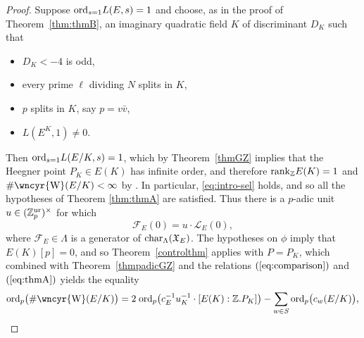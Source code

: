 \documentclass[10pt]{amsart}
\newcommand{\sha}{\text{\wncyr{W}}}
\numberwithin{equation}{section}
\theoremstyle{definition}
\theoremstyle{remark}
\newcommand{\Z}{\mathbb{Z}}
\begin{document}
\begin{proof}
Suppose ${\rm ord}_{s=1}L(E,s)=1$ and choose, as in the proof of Theorem~\ref{thm:thmB}, an imaginary quadratic field $K$ of discriminant $D_K$ such that
\begin{itemize}
\item[(a)] $D_K<-4$ is odd,
\item[(b)] every prime $\ell$ dividing $N$ splits in $K$,
\item[(c)] $p$ splits in $K$, say $p=v\bar{v}$,
\item[(d)] $L(E^K,1)\neq 0$.
\end{itemize}
Then ${\rm ord}_{s=1}L(E/K,s)=1$, which by Theorem~\ref{thmGZ} implies that the Heegner point $P_K\in E(K)$ has infinite order, and therefore ${\rm rank}_\Z E(K)=1$ and $\#\sha(E/K)<\infty$ by \cite{kolyvagin-mw-sha}. 
In particular, \eqref{eq:intro-sel} holds, and so all the hypotheses of Theorem \ref{thm:thmA} are satisfied. Thus there is a $p$-adic unit $u\in(\Z_p^{{\rm ur}})^\times$ for which
\begin{equation}\label{eq:thmA}
\mathcal{F}_E(0)=u\cdot\mathcal{L}_E(0),
\end{equation}
where $\mathcal{F}_E\in\Lambda$ is a generator of ${\rm char}_\Lambda(\mathfrak{X}_E)$. The hypotheses on $\phi$ imply that $E(K)[p]=0$, and so Theorem~\ref{controlthm} applies with $P=P_K$, which combined with Theorem~\ref{thmpadicGZ} and the relations $(\ref{eq:comparison})$ and $(\ref{eq:thmA})$ 
yields the equality
\begin{equation}\label{eq:thmA-bis}
{\rm ord}_p\bigl(\#\sha(E/K)\bigr)=2\;{\rm ord}_p\bigl(c_E^{-1}u_K^{-1}\cdot[E(K):\Z.P_K]\bigr)-\sum_{w\in S}{\rm ord}_p\bigl(c_w(E/K)\bigr),
\end{equation}
 

\end{proof}
\end{document}
